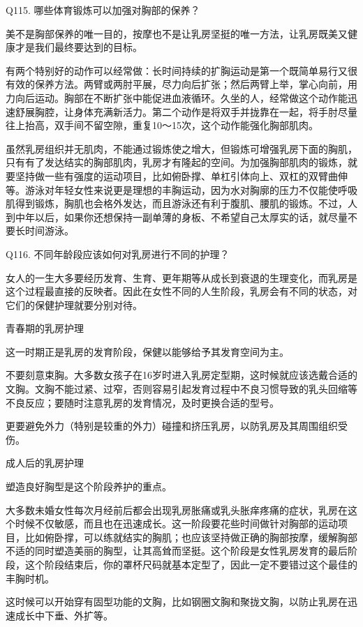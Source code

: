 \documentclass[12pt,UTF8]{ctexbook}
\begin{document}
Q115. 哪些体育锻炼可以加强对胸部的保养？


美不是胸部保养的唯一目的，按摩也不是让乳房坚挺的唯一方法，让乳房既美又健康才是我们最终要达到的目标。

有两个特别好的动作可以经常做：长时间持续的扩胸运动是第一个既简单易行又很有效的保养方法。两臂或两肘平展，尽力向后扩张；然后两臂上举，掌心向前，用力向后运动。胸部在不断扩张中能促进血液循环。久坐的人，经常做这个动作能迅速舒展胸腔，让身体充满新活力。第二个动作是将双手并拢靠在一起，将手肘尽量往上抬高，双手间不留空隙，重复10～15次，这个动作能强化胸部肌肉。

虽然乳房组织并无肌肉，不能通过锻炼使之增大，但锻炼可增强乳房下面的胸肌，只有有了发达结实的胸部肌肉，乳房才有隆起的空间。为加强胸部肌肉的锻炼，就要坚持做一些有强度的运动项目，比如俯卧撑、单杠引体向上、双杠的双臂曲伸等。游泳对年轻女性来说更是理想的丰胸运动，因为水对胸廓的压力不仅能使呼吸肌得到锻炼，胸肌也会格外发达，而且游泳还有利于腹肌、腰肌的锻炼。不过，人到中年以后，如果你还想保持一副单薄的身板、不希望自己太厚实的话，就尽量不要长时间游泳。





Q116. 不同年龄段应该如何对乳房进行不同的护理？


女人的一生大多要经历发育、生育、更年期等从成长到衰退的生理变化，而乳房是这个过程最直接的反映者。因此在女性不同的人生阶段，乳房会有不同的状态，对它们的保健护理就要分别对待。

青春期的乳房护理

这一时期正是乳房的发育阶段，保健以能够给予其发育空间为主。

不要刻意束胸。大多数女孩子在16岁时进入乳房定型期，这时候就应该选戴合适的文胸。文胸不能过紧、过窄，否则容易引起发育过程中不良习惯导致的乳头回缩等不良反应；要随时注意乳房的发育情况，及时更换合适的型号。

更要避免外力（特别是较重的外力）碰撞和挤压乳房，以防乳房及其周围组织受伤。

成人后的乳房护理

塑造良好胸型是这个阶段养护的重点。

大多数未婚女性每次月经前后都会出现乳房胀痛或乳头胀痒疼痛的症状，乳房在这个时候不仅敏感，而且也在迅速成长。这一阶段要花些时间做针对胸部的运动项目，比如俯卧撑，可以练就结实的胸肌；也应该坚持做正确的胸部按摩，缓解胸部不适的同时塑造美丽的胸型，让其高耸而坚挺。这个阶段是女性乳房发育的最后阶段，这个阶段结束后，你的罩杯尺码就基本定型了，因此一定不要错过这个最佳的丰胸时机。

这时候可以开始穿有固型功能的文胸，比如钢圈文胸和聚拢文胸，以防止乳房在迅速成长中下垂、外扩等。
\end{document}
